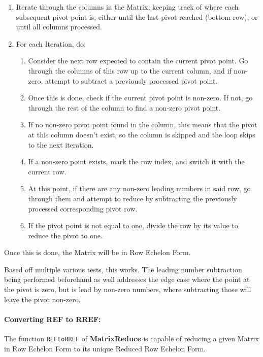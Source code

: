 \documentclass[11pt, a4paper]{article}
\begin{document}
\begin{enumerate}[label*=\arabic*.]
  \item Iterate through the columns in the Matrix, keeping track of where each subsequent pivot point is, either until the last pivot reached (bottom row), or until all columns processed.
  \item For each Iteration, do:
  \begin{enumerate}[label*=\arabic*.]
    \item Consider the next row expected to contain the current pivot point. Go through the columns of this row up to the current column, and if non-zero, attempt to subtract a previously processed pivot point.
    \item Once this is done, check if the current pivot point is non-zero. If not, go through the rest of the column to find a non-zero pivot point.
    \item If no non-zero pivot point found in the column, this means that the pivot at this column doesn't exist, so the column is skipped and the loop skips to the next iteration.
    \item If a non-zero point exists, mark the row index, and switch it with the current row.
    \item At this point, if there are any non-zero leading numbers in said row, go through them and attempt to reduce by subtracting the previously processed corresponding pivot row.
    \item If the pivot point is not equal to one, divide the row by its value to reduce the pivot to one.
  \end{enumerate}
\end{enumerate}

Once this is done, the Matrix will be in Row Echelon Form.

Based off multiple various tests, this works.
The leading number subtraction being performed beforehand as well addresses the edge case where the point at the pivot is zero, but is lead by non-zero numbers, where subtracting those will leave the pivot non-zero.

\paragraph{Converting REF to RREF:}

The function \texttt{REFtoRREF} of \textbf{MatrixReduce} is capable of reducing a given Matrix in Row Echelon Form to its unique Reduced Row Echelon Form.
\end{document}
